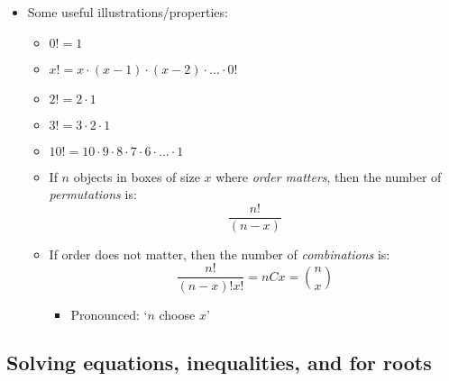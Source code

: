 \begin{itemize}
    \item Some useful illustrations/properties:
    \begin{itemize}
        \item $0! = 1$ 
        \item $x! = x \cdot (x-1) \cdot (x-2) \cdot ... \cdot 0!$
        \item $2! = 2 \cdot 1$
        \item $3! = 3 \cdot 2 \cdot 1$
        \item $10! = 10 \cdot 9 \cdot 8 \cdot 7 \cdot 6 \cdot ... \cdot 1$ 
        \item If $n$ objects in boxes of size $x$ where \emph{order matters}, then the number of \emph{permutations} is:
        \begin{equation*}
            \frac{n!}{(n - x)}
        \end{equation*}
        \item If order does not matter, then the number of \emph{combinations} is:
        \begin{equation*}
            \frac{n!}{(n - x)! x!} = n C x = {n \choose x }
        \end{equation*}
        \begin{itemize}
            \item Pronounced: `$n$ choose $x$'
        \end{itemize}
    \end{itemize}
\end{itemize}

\subsection{Solving equations, inequalities, and for roots}

